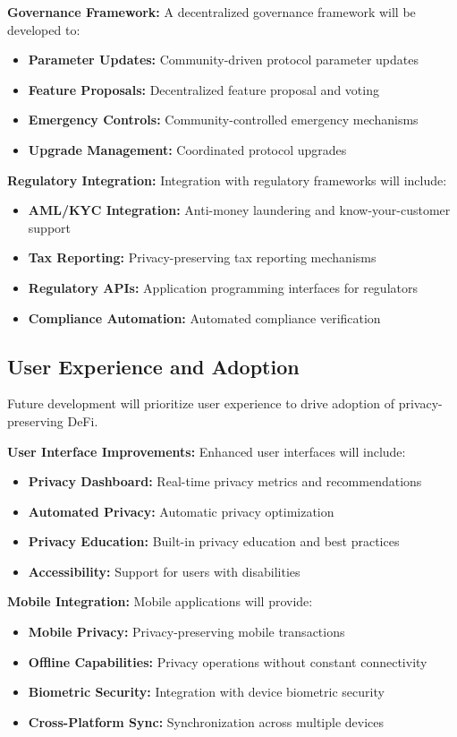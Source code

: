 \documentclass[11pt,a4paper]{article}
\begin{document}
\textbf{Governance Framework:}
A decentralized governance framework will be developed to:
\begin{itemize}
    \item \textbf{Parameter Updates:} Community-driven protocol parameter updates
    \item \textbf{Feature Proposals:} Decentralized feature proposal and voting
    \item \textbf{Emergency Controls:} Community-controlled emergency mechanisms
    \item \textbf{Upgrade Management:} Coordinated protocol upgrades
\end{itemize}

\textbf{Regulatory Integration:}
Integration with regulatory frameworks will include:
\begin{itemize}
    \item \textbf{AML/KYC Integration:} Anti-money laundering and know-your-customer support
    \item \textbf{Tax Reporting:} Privacy-preserving tax reporting mechanisms
    \item \textbf{Regulatory APIs:} Application programming interfaces for regulators
    \item \textbf{Compliance Automation:} Automated compliance verification
\end{itemize}

\subsection{User Experience and Adoption}

Future development will prioritize user experience to drive adoption of privacy-preserving DeFi.

\textbf{User Interface Improvements:}
Enhanced user interfaces will include:
\begin{itemize}
    \item \textbf{Privacy Dashboard:} Real-time privacy metrics and recommendations
    \item \textbf{Automated Privacy:} Automatic privacy optimization
    \item \textbf{Privacy Education:} Built-in privacy education and best practices
    \item \textbf{Accessibility:} Support for users with disabilities
\end{itemize}

\textbf{Mobile Integration:}
Mobile applications will provide:
\begin{itemize}
    \item \textbf{Mobile Privacy:} Privacy-preserving mobile transactions
    \item \textbf{Offline Capabilities:} Privacy operations without constant connectivity
    \item \textbf{Biometric Security:} Integration with device biometric security
    \item \textbf{Cross-Platform Sync:} Synchronization across multiple devices
\end{itemize}
\end{document}

